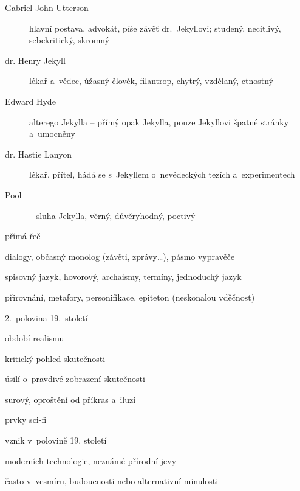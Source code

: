 {\newpart

\begin{description}
	\item[Gabriel John Utterson] hlavní postava, advokát, píše závěť
		dr.~Jekyllovi; studený, necitlivý, sebekritický, skromný
	\item[dr. Henry Jekyll] lékař a~vědec, úžasný člověk, filantrop, chytrý,
		vzdělaný, ctnostný
	\item[Edward Hyde] alterego Jekylla – přímý opak Jekylla, pouze Jekyllovi
		špatné stránky a~umocněny
	\item[dr. Hastie Lanyon] lékař, přítel, hádá se s~Jekyllem o~nevědeckých
		tezích a~experimentech 
	\item[Pool] – sluha Jekylla, věrný, důvěryhodný, poctivý
\end{description}


přímá řeč

dialogy, občasný monolog (závěti, zprávy\dots), pásmo vypravěče

\newpart

spisovný jazyk, hovorový, archaismy, termíny, jednoduchý jazyk


přirovnání, metafory, personifikace, epiteton (neskonalou vděčnost)

\begin{compactitem}
	\item 2.~polovina 19.~století
	\item období realismu
		\begin{compactitem}
			\item kritický pohled skutečnosti
			\item úsilí o~pravdivé zobrazení skutečnosti
			\item surový, oproštění od příkras a~iluzí
		\end{compactitem}
	\item prvky sci-fi
		\begin{compactitem}
			\item vznik v~polovině 19. století
			\item moderních technologie, neznámé přírodní jevy
			\item často v~vesmíru, budoucnosti nebo alternativní minulosti
		\end{compactitem}
\end{compactitem}

}

